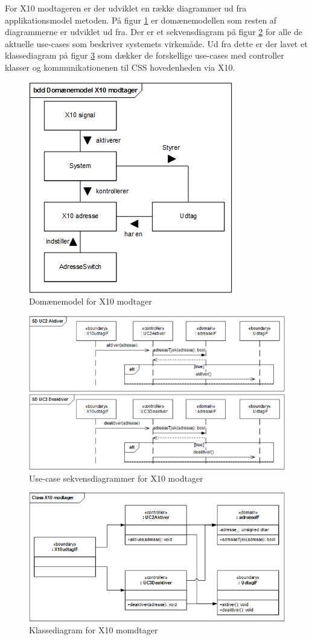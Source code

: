 For X10 modtageren er der udviklet en række diagrammer ud fra applikationsmodel metoden.
På figur \ref{fig:X10_modtager_domain} er domænemodellen som resten af diagrammerne er udviklet ud fra.
Der er et sekvensdiagram på figur \ref{fig:X10_modtager_SD} for alle de aktuelle use-cases som beskriver systemets virkemåde.
Ud fra dette er der lavet et klassediagram på figur \ref{fig:X10_modtager_Class} som dækker de forskellige use-cases med controller klasser og kommunikationenen til CSS hovedenheden via X10.


\begin{figure}[!htb]
\centering \includegraphics{billeder/uml/X10_modtager_Domain}
     \caption{Domænemodel for X10 modtager}
     \label{fig:X10_modtager_domain}
\end{figure}

\begin{figure}[!htb]
	\includegraphics{billeder/uml/X10_modtager_SD}
     \caption{Use-case sekvensdiagrammer for X10 modtager}
     \label{fig:X10_modtager_SD}
\end{figure}

\begin{figure}[!htb]
     \includegraphics{billeder/uml/X10_modtager_Class}
     \caption{Klassediagram for X10 momdtager}
     \label{fig:X10_modtager_Class}
\end{figure}

